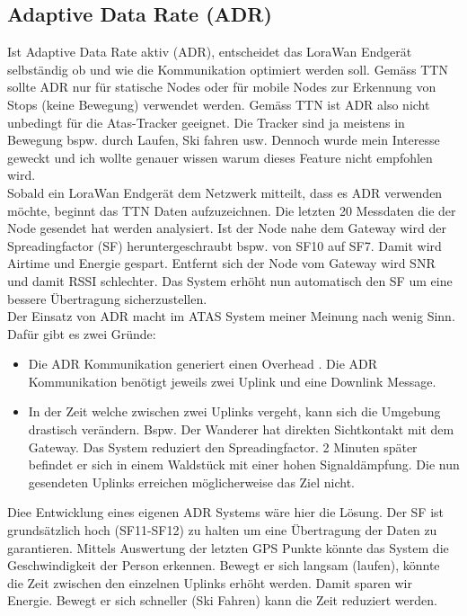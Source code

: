 \documentclass[11pt,english,german]{report}
\theoremstyle{definition}
\begin{document}
\subsection{Adaptive Data Rate (ADR)}
Ist Adaptive Data Rate aktiv (ADR), entscheidet das LoraWan Endgerät selbständig ob und wie die Kommunikation optimiert werden soll. Gemäss TTN \cite{ADRTTN} sollte ADR nur für statische Nodes oder für mobile Nodes zur Erkennung von Stops (keine Bewegung) verwendet werden. Gemäss TTN ist ADR also nicht unbedingt für die Atas-Tracker geeignet. Die Tracker sind ja meistens in Bewegung bspw. durch Laufen, Ski fahren usw. Dennoch wurde mein Interesse geweckt und ich wollte genauer wissen warum dieses Feature nicht empfohlen wird.\\[0.3cm]
Sobald ein LoraWan Endgerät dem Netzwerk mitteilt, dass es ADR verwenden möchte, beginnt das TTN Daten aufzuzeichnen. Die letzten 20 Messdaten die der Node gesendet hat werden analysiert. Ist der Node nahe dem Gateway wird der Spreadingfactor (SF) heruntergeschraubt bspw. von SF10 auf SF7. Damit wird Airtime und Energie gespart. Entfernt sich der Node vom Gateway wird SNR und damit RSSI schlechter. Das System erhöht nun automatisch  den SF um eine bessere Übertragung sicherzustellen.\\[0.3cm]
Der Einsatz von ADR macht im ATAS System meiner Meinung nach wenig Sinn. Dafür gibt es zwei Gründe:
\begin{itemize}
	\item Die ADR Kommunikation generiert einen Overhead \cite{adroverhead}. Die ADR Kommunikation benötigt jeweils zwei Uplink und eine Downlink Message. 
	\item In der Zeit welche zwischen zwei Uplinks vergeht, kann sich die Umgebung drastisch verändern. Bspw. Der Wanderer hat direkten Sichtkontakt mit dem Gateway. Das System reduziert den Spreadingfactor. 2 Minuten später befindet er sich in einem Waldstück mit einer hohen Signaldämpfung. Die nun gesendeten Uplinks erreichen möglicherweise das Ziel nicht.
\end{itemize}Diee Entwicklung eines eigenen ADR Systems wäre hier die Lösung. Der SF ist grundsätzlich hoch (SF11-SF12) zu halten um eine Übertragung der Daten zu garantieren. Mittels Auswertung der letzten GPS Punkte könnte das System die Geschwindigkeit der Person erkennen. Bewegt er sich langsam (laufen), könnte die Zeit zwischen den einzelnen Uplinks erhöht werden. Damit sparen wir Energie. Bewegt er sich schneller (Ski Fahren) kann die Zeit reduziert werden. 
\end{document}
